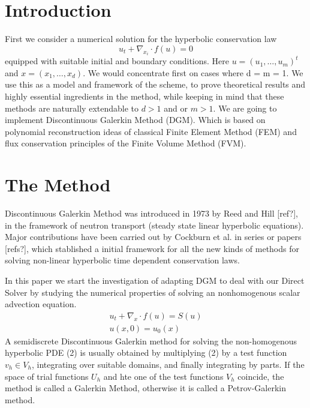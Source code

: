\documentclass[11pt,fleqn]{report}
\begin{document}
\section{Introduction}
First we consider a numerical solution for the hyperbolic conservation law
\begin{equation}
 u_t + \nabla_{x_i} \cdot f(u) = 0
\end{equation}
equipped with suitable initial and boundary conditions. Here
$ u = (u_1, \dots , u_m)^t$ and $x = (x_1, \dots , x_d)$. 
We would concentrate first on cases where d = m = 1. We use this as a model and framework of the scheme, to prove theoretical results and highly essential ingredients in the method, while keeping in mind that these methods are naturally extendable to $d > 1$ and or $m > 1$.
We are going to implement Discontinuous Galerkin Method (DGM). Which is based on polynomial reconstruction ideas of classical Finite Element Method (FEM) and flux conservation principles of the Finite Volume Method (FVM).

\section{The Method}
Discontinuous Galerkin Method was introduced in 1973 by Reed and Hill [ref?], in the framework of neutron transport (steady state linear hyperbolic equations). Major contributions have been carried out by Cockburn et al. in series or papers [refs?], which stablished a initial framework for all the new kinds of methods for solving non-linear hyperbolic time dependent conservation laws.

In this paper we start the investigation of adapting DGM to deal with our Direct Solver by studying the numerical properties of solving an nonhomogenous scalar advection equation.  
\begin{eqnarray}
 u_t + \nabla_x \cdot f(u) = S(u) \\
 u(x,0) = u_0(x) \nonumber
\end{eqnarray}
A semidiscrete Discontinuous Galerkin method for solving the non-homogenous hyperbolic PDE (2) is usually obtained by multiplying (2) by a test function $v_h \in V_h$, integrating over suitable domains, and finally integrating by parts. If the space of trial functions $U_h$ and hte one of the test functions $V_h$ coincide, the method is called a Galerkin Method, otherwise it is called a Petrov-Galerkin method.
\end{document}

